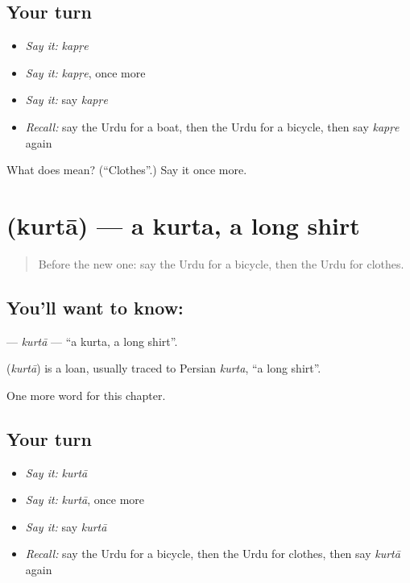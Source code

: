 \subsection*{Your turn}
\begin{itemize}
\raggedright
  \item \emph{Say it:} \emph{kapṛe}
  \item \emph{Say it:} \emph{kapṛe}, once more
  \item \emph{Say it:} say \emph{kapṛe}
  \item \emph{Recall:} say the Urdu for a boat, then the Urdu for a bicycle, then say \emph{kapṛe} again
\end{itemize}

\begin{tcolorbox}[breakable,colback=teal!4,colframe=teal!35!black,title={Before you move on}]
What does  mean? (\textquotedblleft{}Clothes\textquotedblright{}.) Say it once more.
\end{tcolorbox}
\section[\texorpdfstring{\ur{کرتا} (kurtā)}{کرتا (kurtā)}]{ (kurtā) — a kurta, a long shirt}

\label{lesson:UR-C82-kurta}



\begin{quote}
Before the new one: say the Urdu for a bicycle, then the Urdu for clothes.
\end{quote}

\subsection*{You'll want to know: }
\textbf{} — \emph{kurtā} — \textquotedblleft{}a kurta, a long shirt\textquotedblright{}.

\begin{cousinweb}
\textbf{} (\emph{kurtā}) is a loan, usually traced to Persian \emph{kurta}, \textquotedblleft{}a long shirt\textquotedblright{}.
\end{cousinweb}

\begin{grammarlens}[title={What you've built}]
One more word for this chapter.
\end{grammarlens}

\subsection*{Your turn}
\begin{itemize}
\raggedright
  \item \emph{Say it:} \emph{kurtā}
  \item \emph{Say it:} \emph{kurtā}, once more
  \item \emph{Say it:} say \emph{kurtā}
  \item \emph{Recall:} say the Urdu for a bicycle, then the Urdu for clothes, then say \emph{kurtā} again
\end{itemize}

